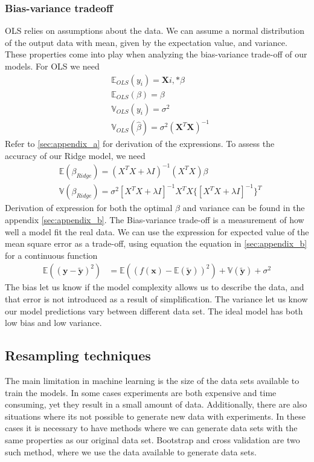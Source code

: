 \subsubsection{Bias-variance tradeoff}
\noindent OLS relies on assumptions about the data. We can assume a normal distribution of the output data with mean, given by the expectation value, and variance. These properties come into play when analyzing the bias-variance trade-off of our models. For OLS we need 
%
\begin{align}
&\mathbb{E}_{OLS}(y_i) = \textbf{X}{i,*} \beta \\
&\mathbb{E}_{OLS}(\beta) = \beta \\
&\mathbb{V}_{OLS}(y_i) = \sigma^2 \\
&\mathbb{V}_{OLS}(\hat{\beta}) = \sigma^2 (\textbf{X}^T \textbf{X})^{-1}
\end{align}
\noindent Refer to \ref{sec:appendix_a} for derivation of the expressions. To assess the accuracy of our Ridge model, we need
%
\begin{align}
    & \mathbb{E}(\beta_{Ridge}) = (X^T X + \lambda I )^{-1}(X^T X)\beta\\
    & \mathbb{V}(\beta_{Ridge}) = \sigma^2[X^T X + \lambda I]^{-1} X^T X \{[X^T X + \lambda I]^{-1}\}^T
\end{align}
%
Derivation of expression for both the optimal $\beta$ and variance can be found in the appendix \ref{sec:appendix_b}. The Bias-variance trade-off is a measurement of how well a model fit the real data. We can use the expression for expected value of the mean square error as a trade-off, using equation the equation in \ref{sec:appendix_b} for a continuous function
\begin{align}\label{eq:trade_off}
    \mathbb{E}((\boldsymbol{y} - \boldsymbol{\tilde{y}})^{2}) &= \mathbb{E}((f(\boldsymbol{x}) - \mathbb{E}(\boldsymbol{\tilde{y}}))^{2}) + \mathbb{V}(\boldsymbol{\tilde{y}}) + \sigma^{2}
\end{align}
%
The bias let us know if the model complexity allows us to describe the data, and that error is not introduced as a result of simplification. The variance let us know our model predictions vary between different data set. The ideal model has both low bias and low variance.

\subsection{Resampling techniques}
\noindent The main limitation in machine learning is the size of the data sets available to train the models. In some cases experiments are both expensive and time consuming, yet they result in  a small amount of data. Additionally, there are also situations where its not possible to generate new data with experiments. In these cases it is necessary to have methods where we can generate data sets with the same properties as our original data set. Bootstrap and cross validation are two such method, where we use the data available to generate data sets.
%
